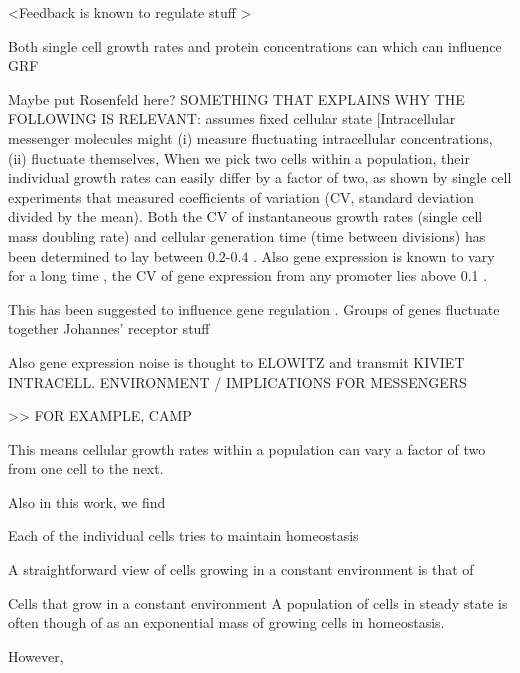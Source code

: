 





<Feedback is known to regulate stuff \cite{Goyal2010}>

Both single cell growth rates and protein concentrations can 
which can influence GRF

Maybe put Rosenfeld here?
SOMETHING THAT EXPLAINS WHY THE FOLLOWING IS RELEVANT:
assumes fixed cellular state
[Intracellular messenger molecules might (i) measure fluctuating intracellular concentrations, (ii) fluctuate themselves, 
%
When we pick two cells within a population, their individual growth rates can easily differ by a factor of two, 
as shown by single cell experiments that measured coefficients of variation (CV, standard deviation divided by the mean).
%
Both the CV of instantaneous growth rates (single cell mass doubling rate) and cellular generation time (time between divisions) has been determined to lay between $0.2$-$0.4$ \cite{Kiviet2014, Hashimoto2016}.
%
Also gene expression is known to vary for a long time \cite{Elowitz2002}, 
the CV of gene expression from any promoter lies above 0.1 \cite{Keren2015}.


This has been suggested to influence gene regulation \cite{Rosenfeld2005}.
Groups of genes fluctuate together \cite{Stewart-Ornstein2012}
Johannes' receptor stuff


Also gene expression noise is thought to ELOWITZ
and transmit KIVIET
INTRACELL. ENVIRONMENT / IMPLICATIONS FOR MESSENGERS 

>> FOR EXAMPLE, CAMP

%
This means cellular growth rates within a population can vary a factor of two from one cell to the next.

Also in this work, we find 



Each of the individual cells tries to maintain homeostasis 


A straightforward view of cells growing in a constant environment is that of 

Cells that grow in a constant environment 
A population of cells in steady state is often though of as an exponential mass of growing cells in homeostasis.
%

% 
However, 

